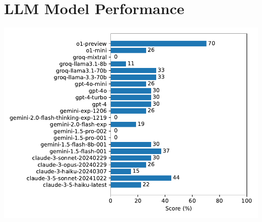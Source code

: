 \documentclass[10pt]{article}
\theoremstyle{definition}
\begin{document}
\section*{LLM Model Performance}
\includegraphics{llm_scores}
\end{document}
